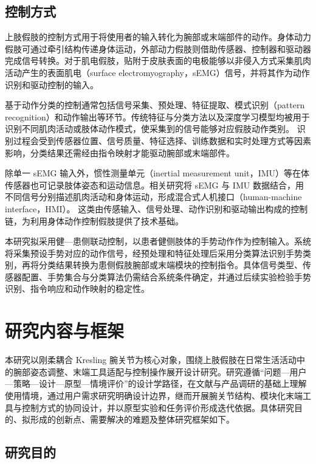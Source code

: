 \subsection{控制方式}

上肢假肢的控制方式用于将使用者的输入转化为腕部或末端部件的动作。身体动力假肢可通过牵引结构传递身体运动，外部动力假肢则借助传感器、控制器和驱动器完成信号转换。对于肌电假肢，贴附于皮肤表面的电极能够以非侵入方式采集肌肉活动产生的表面肌电（surface electromyography，sEMG）信号，并将其作为动作识别和驱动控制的输入。\cite{Fink2023UpperExtremityProstheses,Scheme2011EMGPatternRecognition}

基于动作分类的控制通常包括信号采集、预处理、特征提取、模式识别（pattern recognition）和动作输出等环节。传统特征与分类方法以及深度学习模型均被用于识别不同肌肉活动或肢体动作模式，使采集到的信号能够对应假肢动作类别。\cite{Scheme2011EMGPatternRecognition,Li2021SEMGGestureReview} 识别过程会受到传感器位置、信号质量、特征选择、训练数据和实时处理方式等因素影响，分类结果还需经由指令映射才能驱动腕部或末端部件。

除单一 sEMG 输入外，惯性测量单元（inertial measurement unit，IMU）等在体传感器也可记录肢体姿态和运动信息。相关研究将 sEMG 与 IMU 数据结合，用不同信号分别描述肌肉活动和身体运动，形成混合式人机接口（human-machine interface，HMI）。\cite{Zhou2022HybridSensorsProsthesis} 这类由传感输入、信号处理、动作识别和驱动输出构成的控制链，为利用身体动作控制假肢提供了技术基础。

本研究拟采用健—患侧联动控制，以患者健侧肢体的手势动作作为控制输入。系统将采集预设手势对应的动作信号，经预处理和特征处理后采用分类算法识别手势类别，再将分类结果转换为患侧假肢腕部或末端模块的控制指令。具体信号类型、传感器配置、手势集合与分类算法仍需结合系统条件确定，并通过后续实验检验手势识别、指令响应和动作映射的稳定性。

\section{研究内容与框架}

本研究以刚柔耦合 Kresling 腕关节为核心对象，围绕上肢假肢在日常生活活动中的腕部姿态调整、末端工具适配与控制操作展开设计研究。研究遵循“问题—用户—策略—设计—原型—情境评价”的设计学路径，在文献与产品调研的基础上理解使用情境，通过用户需求研究明确设计边界，继而开展腕关节结构、模块化末端工具与控制方式的协同设计，并以原型实验和任务评价形成迭代依据。具体研究目的、拟形成的创新点、需要解决的难题及整体研究框架如下。

\subsection{研究目的}

